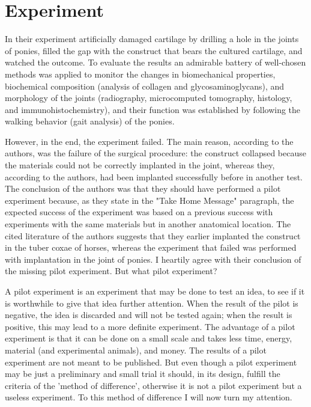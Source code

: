\documentclass[twocolumn, reflection, authordate,  issue]{jote-new-article}
\begin{document}
\section{Experiment} 

In their experiment \textcite{Diloksumpan2021} artificially damaged cartilage by drilling a hole in the joints of ponies, filled the gap with the construct that bears the cultured cartilage, and watched the outcome. To evaluate the results an admirable battery of well-chosen methods was applied to monitor the changes in biomechanical properties, biochemical composition (analysis of collagen and glycosaminoglycans), and morphology of the joints (radiography, microcomputed tomography, histology, and immunohistochemistry), and their function was established by following the walking behavior (gait analysis) of the ponies.

However, in the end, the experiment failed. The main reason, according to the authors, was the failure of the surgical procedure: the construct collapsed because the materials could not be correctly implanted in the joint, whereas they, according to the authors, had been implanted successfully before in another test. The conclusion of the authors was that they should have performed a pilot experiment because, as they state in the "Take Home Message" paragraph, the expected success of the experiment was based on a previous success with experiments with the same materials but in another anatomical location. The cited literature of the authors suggests that they earlier implanted the construct in the tuber coxae of horses, whereas the experiment that failed was performed with implantation in the joint of ponies. I heartily agree with their conclusion of the missing pilot experiment. But what pilot experiment?
A pilot experiment is an experiment that may be done to test an idea, to see if it is worthwhile to give that idea further attention. When the result of the pilot is negative, the idea is discarded and will not be tested again; when the result is positive, this may lead to a more definite experiment. The advantage of a pilot experiment is that it can be done on a small scale and takes less time, energy, material (and experimental animals), and money. The results of a pilot experiment are not meant to be published. But even though a pilot experiment may be just a preliminary and small trial it should, in its design, fulfill the criteria of the 'method of difference', otherwise it is not a pilot experiment but a useless experiment. To this method of difference I will now turn my attention.
\end{document}

